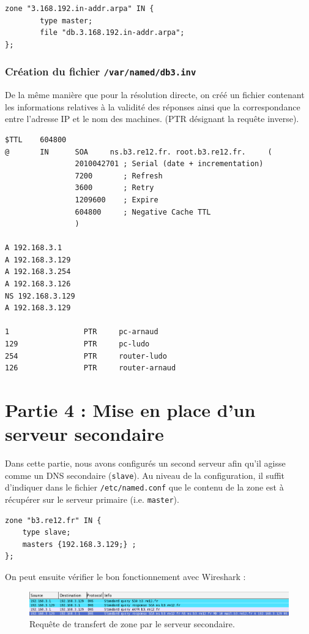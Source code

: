 \documentclass[12pt,a4paper,notitlepage]{article}
\begin{document}
\begin{lstlisting}[title=Ajout de la zone inverse à gérer]
zone "3.168.192.in-addr.arpa" IN {
        type master;
        file "db.3.168.192.in-addr.arpa";
};
\end{lstlisting}

\subsubsection{Création du fichier \texttt{/var/named/db3.inv}}
De la même manière que pour la résolution directe, on créé un fichier contenant les informations relatives à la validité des réponses ainsi que la correspondance entre l'adresse IP et le nom des machines. (PTR désignant la requête inverse).
\begin{lstlisting}[title=Paramètres de la zone inverse]
$TTL    604800
@       IN      SOA     ns.b3.re12.fr. root.b3.re12.fr.     (
                2010042701 ; Serial (date + incrementation)
                7200       ; Refresh
                3600       ; Retry
                1209600    ; Expire
                604800     ; Negative Cache TTL
                )

A 192.168.3.1
A 192.168.3.129
A 192.168.3.254
A 192.168.3.126
NS 192.168.3.129
A 192.168.3.129

1                 PTR     pc-arnaud
129               PTR     pc-ludo
254               PTR     router-ludo
126               PTR     router-arnaud
\end{lstlisting}


\clearpage
\section{Partie 4 : Mise en place d'un serveur secondaire}

Dans cette partie, nous avons configurés un second serveur afin qu'il agisse comme un DNS secondaire (\texttt{slave}). Au niveau de la configuration, il suffit d'indiquer dans le fichier \texttt{/etc/named.conf} que le contenu de la zone est à récupérer sur le serveur primaire (i.e. \texttt{master}).\\


\begin{lstlisting}[title=Configuration du serveur secondaire]
zone "b3.re12.fr" IN {
	type slave;
	masters {192.168.3.129;} ;
};
\end{lstlisting}\bigskip
On peut ensuite vérifier le bon fonctionnement avec Wireshark :

\begin{figure}[!h]
\begin{center}
\includegraphics[scale=0.43]{dns-secondaire}
\caption{Requête de transfert de zone par le serveur secondaire.}
\label{fig:da}
\end{center}
\end{figure}
\end{document}
